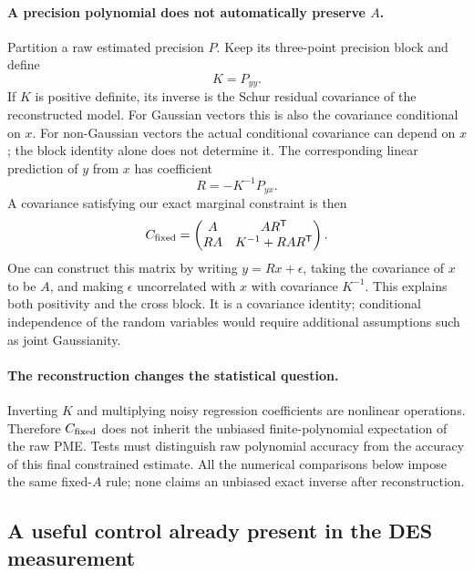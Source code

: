 \documentclass[11pt]{article}
\begin{document}
\paragraph{A precision polynomial does not automatically preserve $A$.}
Partition a raw estimated precision $P$. Keep its three-point precision
block and define
\begin{equation}
 K=P_{yy}.
\end{equation}
If $K$ is positive definite, its inverse is the Schur residual covariance
of the reconstructed model. For Gaussian vectors this is also the covariance
conditional on $x$. For non-Gaussian vectors the actual conditional
covariance can depend on $x$; the block identity alone does not determine it.
The corresponding linear prediction of $y$ from $x$ has coefficient
\begin{equation}
 R=-K^{-1}P_{yx}.
\end{equation}
A covariance satisfying our exact marginal constraint is then
\begin{equation}
 C_{\rm fixed}=\begin{pmatrix}
 A&AR^{\mathsf T}\\
 RA&K^{-1}+RAR^{\mathsf T}
 \end{pmatrix}.
\end{equation}
One can construct this matrix by writing $y=Rx+\epsilon$, taking the
covariance of $x$ to be $A$, and making $\epsilon$ uncorrelated with $x$
with covariance $K^{-1}$. This explains both positivity and the cross
block. It is a covariance identity; conditional independence of the
random variables would require additional assumptions such as joint
Gaussianity.

\paragraph{The reconstruction changes the statistical question.}
Inverting $K$ and multiplying noisy regression coefficients are nonlinear
operations. Therefore $C_{\rm fixed}$ does not inherit the unbiased
finite-polynomial expectation of the raw PME. Tests must distinguish raw
polynomial accuracy from the accuracy of this final constrained estimate.
All the numerical comparisons below impose the same fixed-$A$ rule; none
claims an unbiased exact inverse after reconstruction.

\subsection{A useful control already present in the DES measurement}
\end{document}
